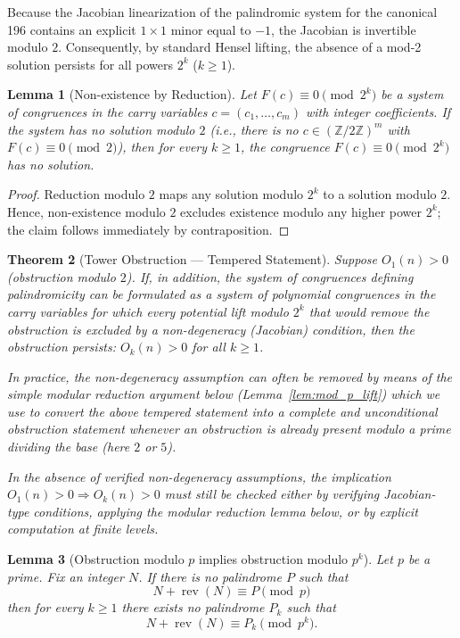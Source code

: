 \documentclass[12pt,a4paper]{article}
\newtheorem{theorem}{Theorem}[section]
\newtheorem{lemma}[theorem]{Lemma}
\begin{document}
Because the Jacobian linearization of the palindromic system for the canonical 196 contains an explicit $1\times1$ minor equal to $-1$, the Jacobian is invertible modulo $2$. Consequently, by standard Hensel lifting, the absence of a mod-2 solution persists for all powers $2^{k}$ ($k\ge 1$).

\begin{lemma}[Non-existence by Reduction]
\label{lem:reduction_nonexist-10}
Let $F(c)\equiv 0\pmod{2^k}$ be a system of congruences in the carry variables $c=(c_1,\dots,c_m)$ with integer coefficients. If the system has no solution modulo $2$ (i.e., there is no $c\in(\mathbb Z/2\mathbb Z)^m$ with $F(c)\equiv0\pmod 2$), then for every $k\ge1$, the congruence $F(c)\equiv0\pmod{2^k}$ has no solution.
\end{lemma}

\begin{proof}
Reduction modulo $2$ maps any solution modulo $2^k$ to a solution modulo $2$. Hence, non-existence modulo $2$ excludes existence modulo any higher power $2^k$; the claim follows immediately by contraposition.
\end{proof}

\begin{theorem}[Tower Obstruction --- Tempered Statement]\label{thm:tower-10}
Suppose $O_1(n) > 0$ (obstruction modulo $2$). If, in addition, the system of congruences defining palindromicity can be formulated as a system of polynomial congruences in the carry variables for which every potential lift modulo $2^k$ that would remove the obstruction is excluded by a non-degeneracy (Jacobian) condition, then the obstruction persists: $O_k(n) > 0$ for all $k \ge 1$.

In practice, the non-degeneracy assumption can often be removed by means of the simple modular reduction argument below (Lemma~\ref{lem:mod_p_lift}) which we use to convert the above tempered statement into a complete and unconditional obstruction statement whenever an obstruction is already present modulo a prime dividing the base (here $2$ or $5$).

In the absence of verified non-degeneracy assumptions, the implication $O_1(n)>0 \Rightarrow O_k(n)>0$ must still be checked either by verifying Jacobian-type conditions, applying the modular reduction lemma below, or by explicit computation at finite levels.
\end{theorem}

\begin{lemma}[Obstruction modulo $p$ implies obstruction modulo $p^k$]
Let $p$ be a prime. Fix an integer $N$. If there is no palindrome $P$ such that
$$N+\operatorname{rev}(N)\equiv P\pmod p$$
then for every $k\ge1$ there exists no palindrome $P_k$ such that
$$N+\operatorname{rev}(N)\equiv P_k\pmod{p^k}.$$
\end{lemma}
\end{document}
